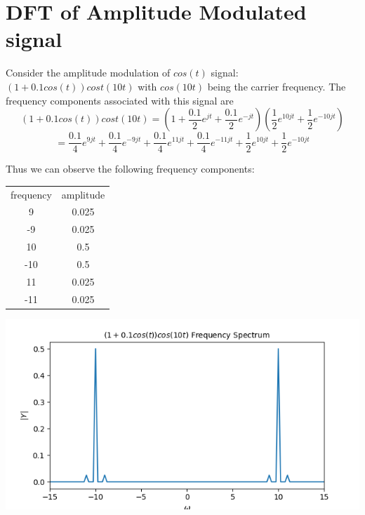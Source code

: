 \documentclass[12pt, a4paper]{report}
\begin{document}
\section*{DFT of Amplitude Modulated signal}
Consider the amplitude modulation of $cos(t)$ signal: $(1+ 0.1cos(t))cost(10t)$ with $cos(10t)$ being the carrier frequency. The frequency components associated with this signal are 
\begin{equation*}
(1+ 0.1cos(t))cost(10t) = (1 + \frac{0.1}{2}e^{jt} + \frac{0.1}{2}e^{-jt})(\frac{1}{2}e^{10jt} + \frac{1}{2}e^{-10jt})
\end{equation*}
\begin{equation*}
 = \frac{0.1}{4}e^{9jt} + \frac{0.1}{4}e^{-9jt} + \frac{0.1}{4}e^{11jt} + \frac{0.1}{4}e^{-11jt} + \frac{1}{2}e^{10jt} + \frac{1}{2}e^{-10jt}
\end{equation*}

Thus we can observe the following frequency components: 
\clearpage
\begin{center}
\begin{tabular}{ |c|c| } 
 \hline
frequency & amplitude \\ 
9 & 0.025\\
-9 & 0.025\\
10 & 0.5\\
-10 & 0.5\\
11 & 0.025\\
-11 & 0.025\\
 \hline
\end{tabular}
\end{center}


\begin{center}
	\includegraphics[scale=0.72]{Figure_3.png} 
	\label{fig:rawdata}
\end{center}
\end{document}
